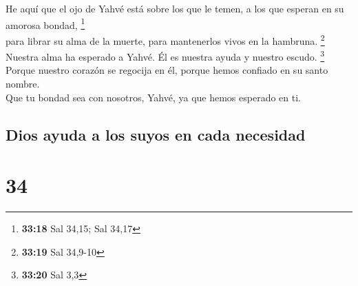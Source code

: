  He aquí que el ojo de Yahvé está sobre los que le temen,
a los que esperan en su amorosa bondad, \footnote{\textbf{33:18} Sal
  34,15; Sal 34,17}\\
 para librar su alma de la muerte, para mantenerlos vivos
en la hambruna. \footnote{\textbf{33:19} Sal 34,9-10}\\
 Nuestra alma ha esperado a Yahvé. Él es nuestra ayuda y
nuestro escudo. \footnote{\textbf{33:20} Sal 3,3}\\
 Porque nuestro corazón se regocija en él, porque hemos
confiado en su santo nombre.\\
 Que tu bondad sea con nosotros, Yahvé, ya que hemos
esperado en ti.

\hypertarget{dios-ayuda-a-los-suyos-en-cada-necesidad}{%
\subsection{Dios ayuda a los suyos en cada
necesidad}\label{dios-ayuda-a-los-suyos-en-cada-necesidad}}

\hypertarget{section-33}{%
\section{34}\label{section-33}}

